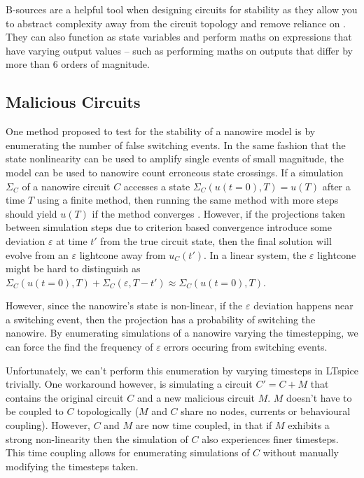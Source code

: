 B-sources are a helpful tool when designing circuits for stability as they
allow you to abstract complexity away from the circuit topology and remove 
reliance on . They can also function as state variables and perform
maths on expressions that have varying output values -- such as performing maths
on outputs that differ by more than 6 orders of magnitude. 

\subsection{Malicious Circuits} \label{malicious_circuits}

One method proposed to test for the stability of a nanowire model is by enumerating
the number of false switching events. In the same fashion that the state nonlinearity
can be used to amplify single events of small magnitude, the model can be used to 
nanowire count erroneous state crossings. If a simulation $\Sigma_C$
of a nanowire circuit $C$ accesses a state $\Sigma_C( u(t=0), T ) = u(T)$ after
a time $T$ using a finite method,
then running the same method with more steps should yield $u(T)$ if the method
converges \cite{DAHLQUIST}.
However, if the projections taken between simulation steps due to criterion 
based convergence introduce some deviation $\varepsilon$ at time $t'$ from the 
true circuit state, then the final solution will evolve from an $\varepsilon$ lightcone
away from $u_C(t')$. In a linear system, the $\varepsilon$ lightcone might be hard to
distinguish as $\Sigma_C(u(t=0), T) + \Sigma_C(\varepsilon, T-t') \approx \Sigma_C(u(t=0), T)$. 

However, since the nanowire's state is non-linear, if the $\varepsilon$ deviation happens
near a switching event, then the projection has a probability of switching the 
nanowire. By enumerating simulations of a nanowire varying the timestepping,
we can force the find the frequency of $\varepsilon$ errors occuring from switching
events.

Unfortunately, we can't perform this enumeration by varying timesteps in LTspice 
trivially. One workaround however, is simulating a circuit $C'=C+M$ that contains
the original circuit $C$ and a new malicious circuit $M$. $M$ doesn't have to be coupled
to $C$ topologically ($M$ and $C$ share no nodes, currents or behavioural coupling).
However, $C$ and $M$ are now time coupled, in that if $M$ exhibits a strong non-linearity
then the simulation of $C$ also experiences finer timesteps. This time coupling allows
for enumerating simulations of $C$ without manually modifying the timesteps taken.

